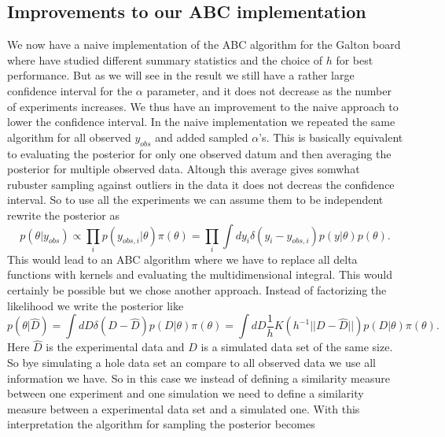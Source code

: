 \documentclass[11pt,a4paper]{article}
\begin{document}




\subsection{Improvements to our ABC implementation}

We now have a naive implementation of the ABC algorithm for the Galton board where have studied different summary statistics and the choice of $h$ for best performance. But as we will see in the result we still have a rather large confidence interval for the $\alpha$ parameter, and it does not decrease as the number of experiments increases. We thus have an improvement to the naive approach to lower the confidence interval. In the naive implementation we repeated the same algorithm for all observed $y_{obs}$ and added sampled $\alpha$'s. This is basically equivalent to evaluating the posterior for only one observed datum and then averaging the posterior for multiple observed data. Altough this average gives somwhat rubuster sampling against outliers in the data it does not decreas the confidence interval. So to use all the experiments we can assume them to be independent rewrite the posterior as
\begin{equation*}
    p(\theta|y_{obs}) \propto  \prod_i p(y_{obs,i}|\theta)\pi(\theta) = \prod_{i} \int d y_i \delta(y_i-y_{obs, i})p(y|\theta) p(\theta).
\end{equation*}
This would lead to an ABC algorithm where we have to replace all delta functions with kernels and evaluating the multidimensional integral. This would certainly be possible but we chose another approach. Instead of factorizing the likelihood we write the posterior like 
\begin{equation*}
    p(\theta|\hat{D}) = \int dD \delta(D - \hat{D}) p(D|\theta) \pi(\theta) = \int dD \frac{1}{h} K(h^{-1}||D - \hat{D}||) p(D|\theta) \pi(\theta).
\end{equation*}
Here $\hat{D}$ is the experimental data and $D$ is a simulated data set of the same size. So bye simulating a hole data set an compare to all observed data we use all information we have. So in this case we instead of defining a similarity measure between one experiment and one simulation we need to define a similarity measure between a experimental data set and a simulated one. With this interpretation the algorithm for sampling the posterior becomes
\end{document}

